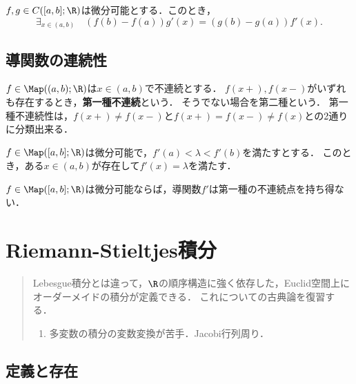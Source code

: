 \documentclass[uplatex, dvipdfmx]{jsreport}
\begin{document}
\begin{theorem}
    $f,g\in C([a,b];\R)$は微分可能とする．このとき，
    \[\exists_{x\in(a,b)}\quad (f(b)-f(a))g'(x)=(g(b)-g(a))f'(x).\]
\end{theorem}

\section{導関数の連続性}

\begin{definition}
    $f\in\Map((a,b);\R)$は$x\in(a,b)$で不連続とする．
    $f(x+),f(x-)$がいずれも存在するとき，\textbf{第一種不連続}という．
    そうでない場合を第二種という．
    第一種不連続性は，$f(x+)\ne f(x-)$と$f(x+)=f(x-)\ne f(x)$との2通りに分類出来る．
\end{definition}

\begin{theorem}
    $f\in\Map([a,b];\R)$は微分可能で，$f'(a)<\lambda<f'(b)$を満たすとする．
    このとき，ある$x\in(a,b)$が存在して$f'(x)=\lambda$を満たす．
\end{theorem}

\begin{corollary}
    $f\in\Map([a,b];\R)$は微分可能ならば，導関数$f'$は第一種の不連続点を持ち得ない．
\end{corollary}

\chapter{Riemann-Stieltjes積分}

\begin{quotation}
    Lebesgue積分とは違って，$\R$の順序構造に強く依存した，Euclid空間上にオーダーメイドの積分が定義できる．
    これについての古典論を復習する．
    \begin{enumerate}
        \item 多変数の積分の変数変換が苦手．Jacobi行列周り．
    \end{enumerate}
\end{quotation}

\section{定義と存在}
\end{document}
